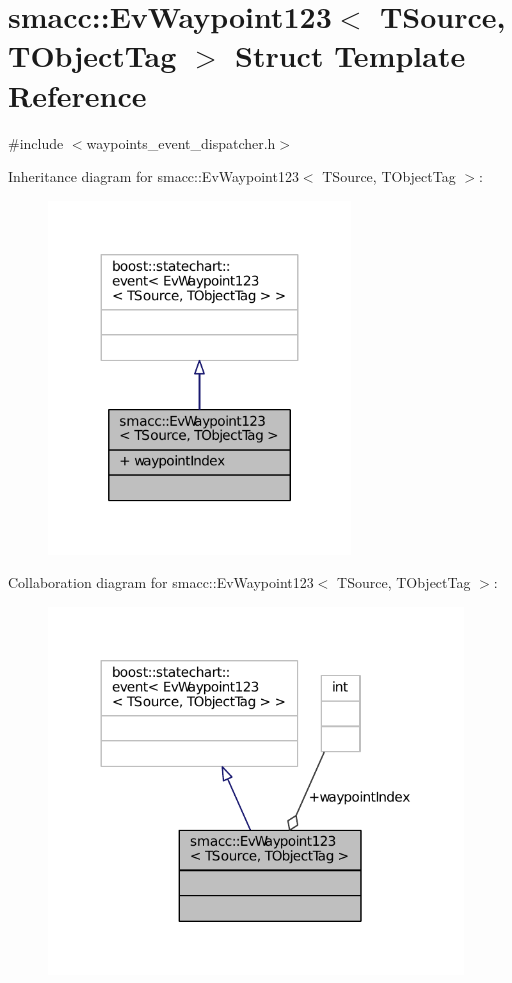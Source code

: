 \hypertarget{structsmacc_1_1EvWaypoint123}{}\section{smacc\+:\+:Ev\+Waypoint123$<$ T\+Source, T\+Object\+Tag $>$ Struct Template Reference}
\label{structsmacc_1_1EvWaypoint123}


{\ttfamily \#include $<$waypoints\+\_\+event\+\_\+dispatcher.\+h$>$}



Inheritance diagram for smacc\+:\+:Ev\+Waypoint123$<$ T\+Source, T\+Object\+Tag $>$\+:
\nopagebreak
\begin{figure}[H]
\begin{center}
\leavevmode
\includegraphics[width=227pt]{structsmacc_1_1EvWaypoint123__inherit__graph}
\end{center}
\end{figure}


Collaboration diagram for smacc\+:\+:Ev\+Waypoint123$<$ T\+Source, T\+Object\+Tag $>$\+:
\nopagebreak
\begin{figure}[H]
\begin{center}
\leavevmode
\includegraphics[width=312pt]{structsmacc_1_1EvWaypoint123__coll__graph}
\end{center}
\end{figure}
